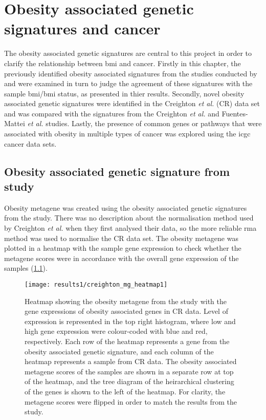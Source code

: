 \chapter{Obesity associated genetic signatures and cancer}
\label{cha:obesity_genetic_signatures_and_cancer}

The obesity associated genetic signatures are central to this project in order to clarify the relationship between \gls{bmi} and cancer.
Firstly in this chapter, the previously identified obesity associated signatures from the studies conducted by \citet{Creighton2012} and \citet{Fuentes-Mattei2014} were examined in turn to judge the agreement of these signatures with the sample \gls{bmi}/\gls{bmi} status, as presented in thier results.
Secondly, novel obesity associated genetic signatures were identified in the Creighton \textit{et al.} (CR) data set and was compared with the signatures from the Creighton \textit{et al.} and Fuentes-Mattei \textit{et al.} studies.
Lastly, the presence of common genes or pathways that were associated with obesity in multiple types of cancer was explored using the \gls{icgc} cancer data sets.

\section{Obesity associated genetic signature from \citet{Creighton2012} study}
\label{sec:creighton_obesity_metagene}

Obesity metagene was created using the obesity associated genetic signatures from the \citet{Creighton2012} study.
There was no description about the normalisation method used by Creighton \textit{et al.} when they first analysed their data, so the more reliable \gls{rma} method was used to  normalise the CR data set.
The obesity metagene was plotted in a heatmap with the sample gene expression  to check whether the metagene scores were in accordance with the overall gene expression of the samples (\cref{fig:crmetaheat}).

\begin{figure}[htb]
	\centering
	\texttt{[image: results1/creighton\_mg\_heatmap1]}
	\caption[Obesity metagene from \citet{Creighton2012} study and sample gene expression in CR data]{Heatmap showing the obesity metagene from the \citet{Creighton2012} study with the gene expressions of obesity associated genes in CR data.
	Level of expression is represented in the top right histogram, where low and high gene expression were colour-coded with blue and red, respectively.
	Each row of the heatmap represents a gene from the obesity associated genetic signature, and each column of the heatmap represents a sample from CR data.
	The obesity associated metagene scores of the samples are shown in a separate row at top of the heatmap, and the tree diagram of the heirarchical clustering of the genes is shown to the left of the heatmap.
	For clarity, the metagene scores were flipped in order to match the results from the \citet{Creighton2012} study.}
	\label{fig:crmetaheat}
\end{figure}

